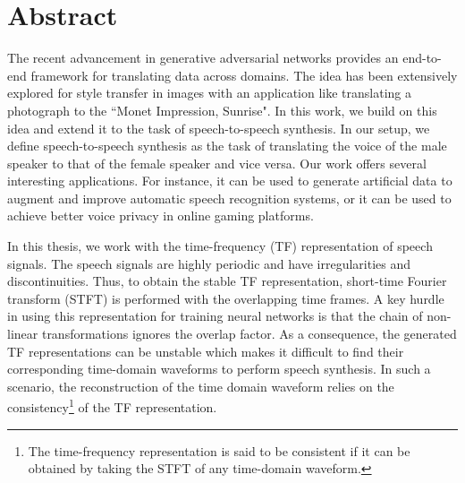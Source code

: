 \chapter*{\centering \Large Abstract}
\label{abstract}
The recent advancement in generative adversarial networks provides an end-to-end framework for translating data across domains. 
The idea has been extensively explored for style transfer in images with an application like translating a photograph to the ``Monet Impression, Sunrise". In this work, we build on this idea and extend it to the task of speech-to-speech synthesis. In our setup, we define speech-to-speech synthesis as the task of translating the voice of the male speaker to that of the female speaker and vice versa. Our work offers several interesting applications. For instance, it can be used to generate artificial data to augment and improve automatic speech recognition systems, or it can be used to achieve better voice privacy in online gaming platforms.  

In this thesis, we work with the time-frequency (TF) representation of speech signals. 
The speech signals are highly periodic and have irregularities and discontinuities. Thus, to obtain the stable TF representation, short-time Fourier transform (STFT) is performed with the overlapping time frames. %
A key hurdle in using this representation for training neural networks is that the chain of non-linear transformations ignores the overlap factor. As a consequence, the generated TF representations can be unstable which makes it difficult to find their corresponding time-domain waveforms to perform speech synthesis. In such a scenario, the reconstruction of the time domain waveform relies on the consistency\footnote{The time-frequency representation is said to be consistent if it can be obtained by taking the STFT of any time-domain waveform.} of the TF representation.

